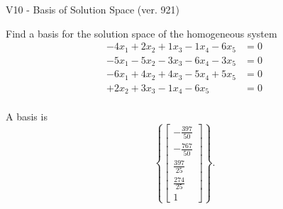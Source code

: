 \begin{exercise}
  \begin{exerciseTitle}V10 - Basis of Solution Space (ver. 921)\end{exerciseTitle}
  \begin{exerciseStatement}
    Find a basis for the solution space of the homogeneous system 
\begin{align*}
 -4 x_ 1 + 2 x_ 2 + 1 x_ 3 -1 x_ 4 -6 x_ 5 &= 0  \\ 
  -5 x_ 1 -5 x_ 2 -3 x_ 3 -6 x_ 4 -3 x_ 5 &= 0  \\ 
  -6 x_ 1 + 4 x_ 2 + 4 x_ 3 -5 x_ 4 + 5 x_ 5 &= 0  \\ 
  + 2 x_ 2 + 3 x_ 3 -1 x_ 4 -6 x_ 5 &= 0  \\ 
 \end{align*}


 
  \end{exerciseStatement}

  \begin{exerciseAnswer}
   A basis is   
\[\left\{\left[\begin{array}{c}
-\frac{397}{50} \\
-\frac{767}{50} \\
\frac{397}{25} \\
\frac{274}{25} \\
1
\end{array}\right]\right\}.\]

  


  \end{exerciseAnswer}
\end{exercise}